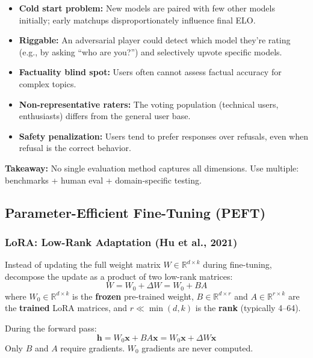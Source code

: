 \documentclass[11pt, a4paper]{article}
\begin{document}
\begin{warnbox}
\begin{itemize}[leftmargin=1.5em]
  \item \textbf{Cold start problem:} New models are paired with few other models initially; early matchups disproportionately influence final ELO.
  \item \textbf{Riggable:} An adversarial player could detect which model they're rating (e.g., by asking ``who are you?'') and selectively upvote specific models.
  \item \textbf{Factuality blind spot:} Users often cannot assess factual accuracy for complex topics.
  \item \textbf{Non-representative raters:} The voting population (technical users, enthusiasts) differs from the general user base.
  \item \textbf{Safety penalization:} Users tend to prefer responses over refusals, even when refusal is the correct behavior.
\end{itemize}
\textbf{Takeaway:} No single evaluation method captures all dimensions. Use multiple: benchmarks + human eval + domain-specific testing.
\end{warnbox}

\subsection{Parameter-Efficient Fine-Tuning (PEFT)}

\subsubsection{LoRA: Low-Rank Adaptation (Hu et al., 2021)}

\begin{defbox}[LoRA]
Instead of updating the full weight matrix $W \in \mathbb{R}^{d \times k}$ during fine-tuning, decompose the update as a product of two low-rank matrices:
\[
W = W_0 + \Delta W = W_0 + B A
\]
where $W_0 \in \mathbb{R}^{d \times k}$ is the \textbf{frozen} pre-trained weight, $B \in \mathbb{R}^{d \times r}$ and $A \in \mathbb{R}^{r \times k}$ are the \textbf{trained} LoRA matrices, and $r \ll \min(d, k)$ is the \textbf{rank} (typically 4--64).

During the forward pass:
\[
\mathbf{h} = W_0 \mathbf{x} + B A \mathbf{x} = W_0 \mathbf{x} + \Delta W \mathbf{x}
\]
Only $B$ and $A$ require gradients. $W_0$ gradients are never computed.
\end{defbox}
\end{document}
